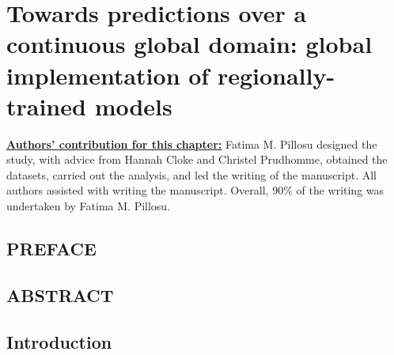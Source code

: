 \ClearShipoutPicture
{}

\chapter{Towards predictions over a continuous global domain: 
global implementation of regionally-trained models}
\label{regional_to_global_training}
\graphicspath{{chapter_07/figures}{chapter_07/tables}}

\underline{\textbf{Authors' contribution for this chapter:}} Fatima M. Pillosu designed the study, with advice from Hannah Cloke and Christel Prudhomme, obtained the datasets, carried out the analysis, and led the writing of the manuscript. All authors assisted with writing the manuscript. Overall, 90\% of the writing was undertaken by Fatima M. Pillosu.

\vspace{\baselineskip}

\section*{PREFACE}



\clearpage

\section*{ABSTRACT}

\clearpage



\section{Introduction}

